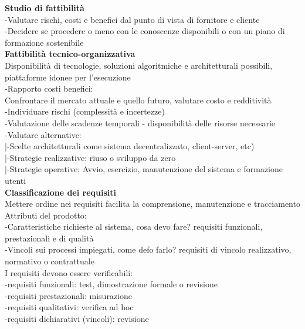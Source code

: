 \documentclass{article}
\begin{document}
		
		\textbf{Studio di fattibilità}\\
		-Valutare rischi, costi e benefici dal punto di vista di fornitore e cliente\\
		-Decidere se procedere o meno con le conoscenze disponibili o con un piano di formazione sostenibile\\
		
		\textbf{Fattibilità tecnico-organizzativa}\\
		Disponibilità di tecnologie, soluzioni algoritmiche e architetturali possibili, piattaforme idonee per l'esecuzione\\
		-Rapporto costi benefici:\\
		Confrontare il mercato attuale e quello futuro, valutare costo e redditività\\
		-Individuare rischi (complessità e incertezze)\\
		-Valutazione delle scadenze temporali - disponibilità delle risorse necessarie\\
		-Valutare alternative:\\
		|-Scelte architetturali come sistema decentralizzato, client-server, etc)\\
		|-Strategie realizzative: riuso o sviluppo da zero\\
		|-Strategie operative: Avvio, esercizio, manutenzione del sistema e formazione utenti\\
		
		
		\textbf{Classificazione dei requisiti}\\
		Mettere ordine nei requisiti facilita la comprensione, manutenzione e tracciamento\\
		Attributi del prodotto:\\
		-Caratteristiche richieste al sistema, cosa devo fare? requisiti funzionali, prestazionali e di qualità\\
		-Vincoli sui processi impiegati, come defo farlo? requisiti di vincolo realizzativo, normativo o contrattuale\\
		I requisiti devono essere verificabili:\\
		-requisiti funzionali: test, dimostrazione formale o revisione\\
		-requisiti prestazionali: misurazione\\
		-requisiti qualitativi: verifica ad hoc\\
		-requisiti dichiarativi (vincoli): revisione\\
				
\end{document}
